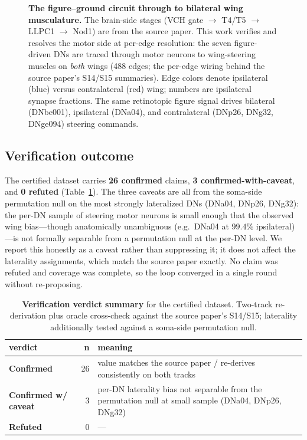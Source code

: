 \documentclass[11pt]{article}
\begin{document}
\begin{figure}[t]
{%
}
\caption{\textbf{The figure--ground circuit through to bilateral wing musculature.} The brain-side
stages (VCH gate $\rightarrow$ T4/T5 $\rightarrow$ LLPC1 $\rightarrow$ Nod1) are from the source paper.
This work verifies and resolves the motor side at per-edge resolution: the seven figure-driven DNs are
traced through motor neurons to wing-steering muscles on \emph{both} wings (488 edges; the per-edge
wiring behind the source paper's S14/S15 summaries). Edge colors denote ipsilateral (blue) versus
contralateral (red) wing; numbers are ipsilateral synapse fractions. The same retinotopic figure signal
drives bilateral (DNbe001), ipsilateral (DNa04), and contralateral (DNp26, DNg32, DNge094) steering
commands.}
\label{fig:circuit}
\end{figure}

\subsection{Verification outcome}

The certified dataset carries \textbf{\textcolor{confirm}{26 confirmed}} claims,
\textbf{\textcolor{caveat}{3 confirmed-with-caveat}}, and \textbf{0 refuted} (Table~\ref{tab:verdicts}).
The three caveats are all from the soma-side permutation null on the most strongly lateralized DNs
(DNa04, DNp26, DNg32): the per-DN sample of steering motor neurons is small enough that the observed
wing bias---though anatomically unambiguous (e.g.\ DNa04 at $99.4\%$ ipsilateral)---is not formally
separable from a permutation null at the per-DN level. We report this honestly as a caveat rather than
suppressing it; it does not affect the laterality assignments, which match the source paper exactly.
No claim was refuted and coverage was complete, so the loop converged in a single round without
re-proposing.

\begin{table}[t]
\centering
\small
\caption{\textbf{Verification verdict summary} for the certified dataset. Two-track re-derivation plus
oracle cross-check against the source paper's S14/S15; laterality additionally tested against a
soma-side permutation null.}
\label{tab:verdicts}
\begin{tabular}{l r p{8.2cm}}
\toprule
\textbf{verdict} & \textbf{n} & \textbf{meaning} \\
\midrule
\textcolor{confirm}{\textbf{Confirmed}} & 26 & value matches the source paper / re-derives consistently on both tracks \\
\textcolor{caveat}{\textbf{Confirmed w/ caveat}} & 3 & per-DN laterality bias not separable from the permutation null at small sample (DNa04, DNp26, DNg32) \\
\textbf{Refuted} & 0 & --- \\
\bottomrule
\end{tabular}
\end{table}
\end{document}
